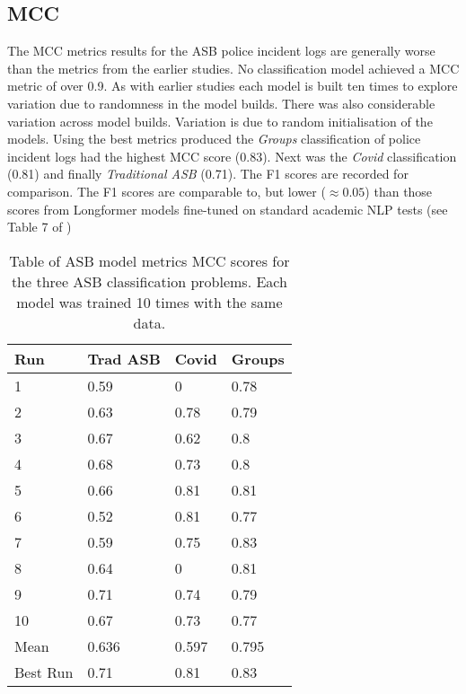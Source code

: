\subsection{MCC} The MCC metrics results for the ASB police incident logs are generally worse than the metrics from the earlier studies. No classification model achieved a MCC metric of over 0.9. As with earlier studies each model is built ten times to explore variation due to randomness in the model builds. There was also considerable variation across model builds. Variation is due to random initialisation of the models. Using the best metrics produced the \emph{Groups} classification of police incident logs had the highest MCC score (0.83). Next was the \emph{Covid} classification (0.81) and finally \emph{Traditional ASB} (0.71). The F1 scores are recorded for comparison. The F1 scores are comparable to, but lower ($\approx 0.05$) than those scores from Longformer models fine-tuned on standard academic NLP tests (see Table 7 of \textcite{beltagy2020longformer}) 

\begin{table}[h]
\centering
\begin{tabular}{@{}llll@{}}
\toprule
Run      & Trad ASB & Covid & Groups \\ \midrule
1        & 0.59     & 0     & 0.78   \\
2        & 0.63     & 0.78  & 0.79   \\
3        & 0.67     & 0.62  & 0.8    \\
4        & 0.68     & 0.73  & 0.8    \\
5        & 0.66     & 0.81  & 0.81   \\
6        & 0.52     & 0.81  & 0.77   \\
7        & 0.59     & 0.75  & 0.83   \\
8        & 0.64     & 0     & 0.81   \\
9        & 0.71     & 0.74  & 0.79   \\
10       & 0.67     & 0.73  & 0.77   \\
Mean     & 0.636    & 0.597 & 0.795  \\
Best Run & 0.71     & 0.81  & 0.83   \\ \bottomrule
\end{tabular}
    \caption{{Table of ASB model metrics} MCC scores for the three ASB classification problems. Each model was trained 10 times with the same data.}
    \label{tab: asb_metrics}
\end{table}

